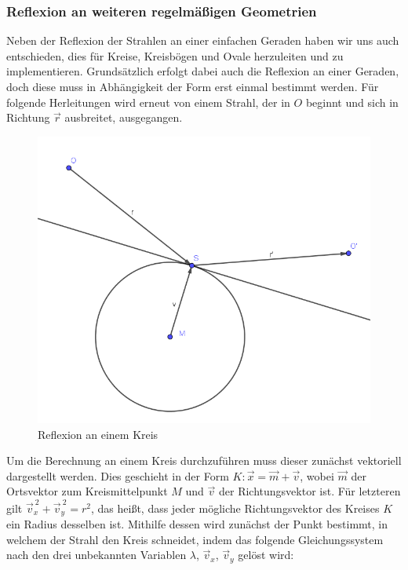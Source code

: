 \documentclass[a4paper, 11pt]{scrartcl}
\begin{document}
\subsubsection{Reflexion an weiteren regelmäßigen Geometrien}
Neben der Reflexion der Strahlen an einer einfachen Geraden haben wir uns auch entschieden, dies für Kreise, Kreisbögen und Ovale herzuleiten und zu implementieren. 
Grundsätzlich erfolgt dabei auch die Reflexion an einer Geraden, doch diese muss in Abhängigkeit der Form erst einmal bestimmt werden. 
Für folgende Herleitungen wird erneut von einem Strahl, der in $O$ beginnt und sich in Richtung $\vec{r}$ ausbreitet, ausgegangen.
\newpage
\begin{figure}
\includegraphics[scale=0.5]{pictures/CircleRef.png}
\caption{Reflexion an einem Kreis}
\end{figure}
Um die Berechnung an einem Kreis durchzuführen muss dieser zunächst vektoriell dargestellt werden.
Dies geschieht in der Form $K: \vec{x} = \vec{m} + \vec{v}$, wobei $\vec{m}$ der Ortsvektor zum Kreismittelpunkt $M$ und $\vec{v}$ der Richtungsvektor ist. 
Für letzteren gilt $\vec{v}_x^{~2} + \vec{v}_y^{~2} = r^2$, das heißt, dass jeder mögliche Richtungsvektor des Kreises $K$ ein Radius desselben ist. 
Mithilfe dessen wird zunächst der Punkt bestimmt, in welchem der Strahl den Kreis schneidet, indem das folgende Gleichungssystem nach den drei unbekannten Variablen $\lambda$, $\vec{v}_x$, $\vec{v}_y$ gelöst wird:
\end{document}

